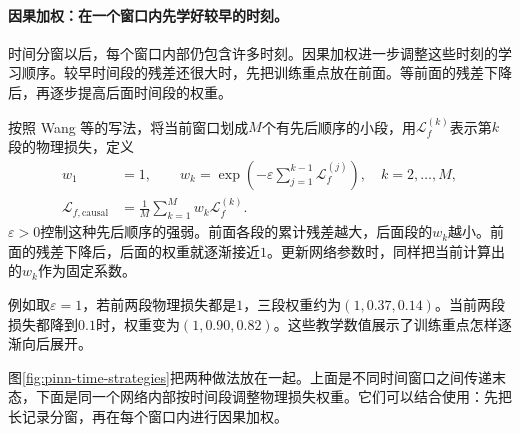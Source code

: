 \paragraph{因果加权：在一个窗口内先学好较早的时刻。}
时间分窗以后，每个窗口内部仍包含许多时刻。因果加权进一步调整这些时刻的学习顺序。较早时间段的残差还很大时，先把训练重点放在前面。等前面的残差下降后，再逐步提高后面时间段的权重。

按照 Wang 等的写法，将当前窗口划成$M$个有先后顺序的小段，用$\mathcal L_f^{(k)}$表示第$k$段的物理损失，定义
\begin{align}
 w_1&=1,\qquad
 w_k=\exp\left(-\varepsilon\sum_{j=1}^{k-1}\mathcal L_f^{(j)}\right),
 \quad k=2,\ldots,M,\\
 \mathcal L_{f,\mathrm{causal}}
 &=\frac1M\sum_{k=1}^{M}w_k\mathcal L_f^{(k)}.
 \label{eq:pinn-causal-weight}
\end{align}
$\varepsilon>0$控制这种先后顺序的强弱。前面各段的累计残差越大，后面段的$w_k$越小。前面的残差下降后，后面的权重就逐渐接近$1$。更新网络参数时，同样把当前计算出的$w_k$作为固定系数\cite{wang2023expert}。

例如取$\varepsilon=1$，若前两段物理损失都是$1$，三段权重约为$(1,0.37,0.14)$。当前两段损失都降到$0.1$时，权重变为$(1,0.90,0.82)$。这些教学数值展示了训练重点怎样逐渐向后展开。

图\ref{fig:pinn-time-strategies}把两种做法放在一起。上面是不同时间窗口之间传递末态，下面是同一个网络内部按时间段调整物理损失权重。它们可以结合使用：先把长记录分窗，再在每个窗口内进行因果加权。

